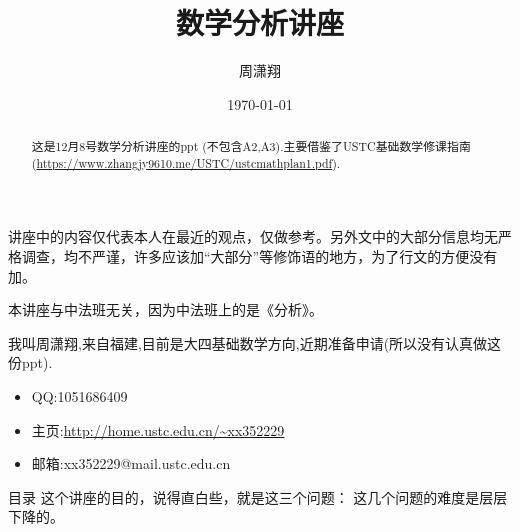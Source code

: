 \documentclass[pdf]{beamer}
\title{数学分析讲座}
\author{周潇翔}
\institute[USTC]{University of Science and Technology of China}
\date{\today}
\numberwithin{equation}{section}
\theoremstyle{plain}
\theoremstyle{plain}
\theoremstyle{plain}
\theoremstyle{remark}
\begin{document}
	\begin{frame}
	\titlepage
	\end{frame}
\begin{frame}
\begin{abstract}
这是12月8号数学分析讲座的ppt (不包含A2,A3).主要借鉴了USTC基础数学修课指南(\url{https://www.zhangjy9610.me/USTC/ustcmathplan1.pdf}).
\end{abstract}

讲座中的内容仅代表本人在最近的观点，仅做参考。另外文中的大部分信息均无严格调查，均不严谨，许多应该加“大部分”等修饰语的地方，为了行文的方便没有加。

本讲座与中法班无关，因为中法班上的是《分析》。
\end{frame}
\begin{frame}
我叫周潇翔,来自福建,目前是大四基础数学方向,近期准备申请(所以没有认真做这份ppt).
\begin{itemize}
	\item QQ:1051686409
	\item 主页:\url{http://home.ustc.edu.cn/~xx352229}
	\item 邮箱:xx352229@mail.ustc.edu.cn
\end{itemize}
\end{frame}
\begin{frame}{目录}
	这个讲座的目的，说得直白些，就是这三个问题：
	\tableofcontents
	这几个问题的难度是层层下降的。
\end{frame}
\end{document}
